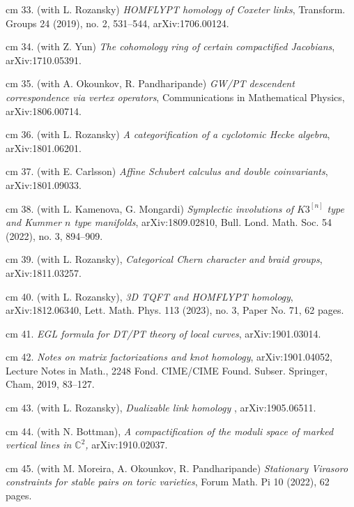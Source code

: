 \documentclass[11pt]{amsart}
\theoremstyle{plain}
\theoremstyle{definition}
\theoremstyle{remark}
\begin{document}
\noindent{} cm 33. (with L. Rozansky) {\it HOMFLYPT homology of Coxeter links}, Transform. Groups 24 (2019), no. 2, 531--544,
arXiv:1706.00124.




\noindent{} cm 34. (with  Z. Yun) {\it The cohomology ring of certain compactified Jacobians},  arXiv:1710.05391. 


\noindent{} cm 35. (with A. Okounkov, R. Pandharipande) {\it  GW/PT descendent correspondence via vertex operators}, Communications in Mathematical Physics, arXiv:1806.00714.



\noindent{} cm 36. (with L. Rozansky)
{\it A categorification of a cyclotomic Hecke algebra}, arXiv:1801.06201.

\noindent{} cm 37. (with E. Carlsson)
{\it Affine Schubert calculus and double coinvariants}, arXiv:1801.09033.

\noindent{} cm 38. (with L. Kamenova, G. Mongardi) {\it Symplectic involutions of \(K3^{[n]}\) type and Kummer \(n\)
  type manifolds}, arXiv:1809.02810, Bull. Lond. Math. Soc. 54 (2022), no. 3, 894--909.

\noindent{} cm 39. (with L. Rozansky), {\it Categorical Chern character and braid groups}, arXiv:1811.03257.

\noindent{} cm 40. (with L. Rozansky), {\it 3D TQFT and HOMFLYPT homology},  arXiv:1812.06340, Lett. Math. Phys. 113 (2023), no. 3, Paper No. 71, 62 pages.

\noindent{} cm 41. {\it EGL formula for DT/PT theory of local curves}, arXiv:1901.03014.

\noindent{} cm 42. {\it Notes on matrix factorizations and knot homology}, arXiv:1901.04052, Lecture Notes in Math., 2248
Fond. CIME/CIME Found. Subser.
Springer, Cham, 2019, 83--127.

\noindent{} cm 43. (with L. Rozansky), {\it Dualizable link homology }, arXiv:1905.06511.

\noindent{} cm 44. (with N. Bottman), {\it 
A compactification of the moduli space of marked vertical lines in $\mathbb{C}^2$, } arXiv:1910.02037.



\noindent{} cm 45. (with M. Moreira, A. Okounkov, R. Pandharipande)
{\it  Stationary Virasoro constraints for stable pairs on toric varieties}, Forum Math. Pi 10 (2022), 62 pages.
\end{document}
